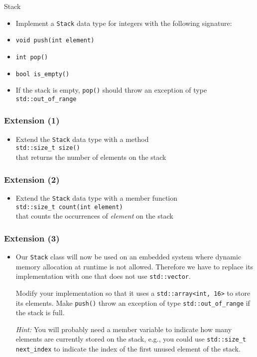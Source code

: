 \documentclass[10pt,aspectratio=169]{beamer}
\begin{document}
\begin{frame}[fragile]{Stack}
\begin{itemize}
\item Implement a \texttt{Stack} data type for integers with the
  following signature:
\item \texttt{void push(int element)}
\item \texttt{int pop()}
\item \verb!bool is_empty()!
\item If the stack is empty, \texttt{pop()} should throw an exception
  of type \verb!std::out_of_range!
\end{itemize}
\end{frame}

\begin{frame}[fragile]
  \frametitle{Extension (1)}  
  \begin{itemize}
  \item Extend the \texttt{Stack} data type with a method\\[1ex]
    \verb!std::size_t size()!\\[1ex]
    that returns the number of elements on the stack
  \end{itemize}
\end{frame}

\begin{frame}[fragile]
  \frametitle{Extension (2)}  
  \begin{itemize}
  \item Extend the \texttt{Stack} data type with a member function\\[1ex]
    \verb!std::size_t count(int element)!\\[1ex]
    that counts the occurrences of \emph{element} on the stack
  \end{itemize}
\end{frame}

\begin{frame}[fragile]
  \frametitle{Extension (3)}
  \begin{itemize}
  \item Our \texttt{Stack} class will now be used on an embedded
    system where dynamic memory allocation at runtime is not allowed.
    Therefore we have to replace its implementation with one that does
    not use \verb!std::vector!.

    Modify your implementation so that it uses a
    \verb|std::array<int, 16>| to store its elements. Make
    \texttt{push()} throw an exception of type
    \verb!std::out_of_range! if the stack is full.

    \bigskip
    \emph{Hint:} You will probably need a member variable to indicate
    how many elements are currently stored on the stack, e.g., you could use
    \verb!std::size_t next_index! to indicate the index of the first
    unused element of the stack.
  \end{itemize}
\end{frame}
\end{document}
